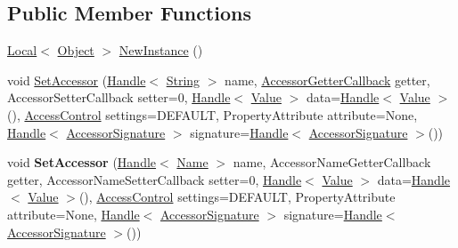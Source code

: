 \subsection*{Public Member Functions}
\begin{DoxyCompactItemize}
\item 
\hyperlink{classv8_1_1_local}{Local}$<$ \hyperlink{classv8_1_1_object}{Object} $>$ \hyperlink{classv8_1_1_object_template_ad25d8ebf37b1a3aaf7d4a03b1a9bd5c1}{New\+Instance} ()
\item 
void \hyperlink{classv8_1_1_object_template_acf245fcdedc797068a1eb4c8d46a5269}{Set\+Accessor} (\hyperlink{classv8_1_1_handle}{Handle}$<$ \hyperlink{classv8_1_1_string}{String} $>$ name, \hyperlink{namespacev8_a722613c87061708a4f1aa050d095f868}{Accessor\+Getter\+Callback} getter, Accessor\+Setter\+Callback setter=0, \hyperlink{classv8_1_1_handle}{Handle}$<$ \hyperlink{classv8_1_1_value}{Value} $>$ data=\hyperlink{classv8_1_1_handle}{Handle}$<$ \hyperlink{classv8_1_1_value}{Value} $>$(), \hyperlink{namespacev8_a31d8355cb043d7d2dda3f4a52760b64e}{Access\+Control} settings=D\+E\+F\+A\+U\+L\+T, Property\+Attribute attribute=None, \hyperlink{classv8_1_1_handle}{Handle}$<$ \hyperlink{classv8_1_1_accessor_signature}{Accessor\+Signature} $>$ signature=\hyperlink{classv8_1_1_handle}{Handle}$<$ \hyperlink{classv8_1_1_accessor_signature}{Accessor\+Signature} $>$())
\item 
\hypertarget{classv8_1_1_object_template_abc6d139c9c5a93b79b653b6965a10f32}{}void {\bfseries Set\+Accessor} (\hyperlink{classv8_1_1_handle}{Handle}$<$ \hyperlink{classv8_1_1_name}{Name} $>$ name, Accessor\+Name\+Getter\+Callback getter, Accessor\+Name\+Setter\+Callback setter=0, \hyperlink{classv8_1_1_handle}{Handle}$<$ \hyperlink{classv8_1_1_value}{Value} $>$ data=\hyperlink{classv8_1_1_handle}{Handle}$<$ \hyperlink{classv8_1_1_value}{Value} $>$(), \hyperlink{namespacev8_a31d8355cb043d7d2dda3f4a52760b64e}{Access\+Control} settings=D\+E\+F\+A\+U\+L\+T, Property\+Attribute attribute=None, \hyperlink{classv8_1_1_handle}{Handle}$<$ \hyperlink{classv8_1_1_accessor_signature}{Accessor\+Signature} $>$ signature=\hyperlink{classv8_1_1_handle}{Handle}$<$ \hyperlink{classv8_1_1_accessor_signature}{Accessor\+Signature} $>$())\label{classv8_1_1_object_template_abc6d139c9c5a93b79b653b6965a10f32}


\end{DoxyCompactItemize}
